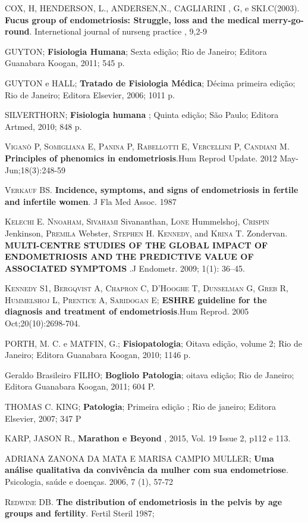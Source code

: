 \documentclass[12pt]{article} %
\begin{document}
COX, H, HENDERSON, L., ANDERSEN,N., CAGLIARINI , G, e SKI.C(2003).  \textbf{ Fucus group of endometriosis: Struggle, loss and the medical merry-go-round}. Internetional journal of nurseng practice , 9,2-9

GUYTON; \textbf{ Fisiologia Humana}; Sexta edição; Rio de Janeiro; Editora Guanabara
Koogan, 2011; 545 p.

GUYTON e HALL; \textbf{ Tratado de Fisiologia Médica}; Décima primeira edição; Rio de
Janeiro; Editora Elsevier, 2006; 1011 p.

SILVERTHORN;\textbf{ Fisiologia humana} ; Quinta edição; São Paulo; Editora Artmed, 2010; 848 p.

\textsc{Viganò} P, \textsc{Somigliana} E, \textsc{Panina} P,\textsc{ Rabellotti E, Vercellini P, Candiani} M. \textbf{Principles of phenomics in endometriosis}.Hum Reprod Update. 2012 May-Jun;18(3):248-59

\textsc{Verkauf} BS. \textbf{ Incidence, symptoms, and signs of endometriosis in fertile and infertile women}. J Fla Med Assoc. 1987

\textsc{Kelechi E. Nnoaham, Sivahami} Sivananthan, \textsc{Lone} Hummelshoj, \textsc{Crispin} Jenkinson, \textsc{Premila} Webster, \textsc{Stephen H. Kennedy}, and \textsc{Krina} T. Zondervan.\textbf{ MULTI-CENTRE STUDIES OF THE GLOBAL IMPACT OF ENDOMETRIOSIS AND THE PREDICTIVE VALUE OF ASSOCIATED SYMPTOMS }.J Endometr. 2009; 1(1): 36–45. 

\textsc{Kennedy S1, Bergqvist A, Chapron C, D'Hooghe T, Dunselman G, Greb R, Hummelshoj L, Prentice A, Saridogan E}; \textbf{ESHRE guideline for the diagnosis and treatment of endometriosis}.Hum Reprod. 2005 Oct;20(10):2698-704. 


PORTH, M. C. e MATFIN, G.;\textbf{ Fisiopatologia}; Oitava edição, volume 2; Rio de
Janeiro; Editora Guanabara Koogan, 2010; 1146 p.

Geraldo Brasileiro FILHO; \textbf{Bogliolo Patologia}; oitava edição; Rio de Janeiro; Editora Guanabara Koogan, 2011; 604 P.

THOMAS C. KING;\textbf{ Patologia}; Primeira edição ; Rio de janeiro; Editora Elsevier, 2007; 347 P

KARP, JASON R., \textbf{Marathon e Beyond }, 2015, Vol. 19 Issue 2, p112 e 113.

ADRIANA ZANONA DA MATA E MARISA CAMPIO MULLER;\textbf{ Uma análise qualitativa da convivência da mulher com sua endometriose}. Psicologia, saúde e doenças. 2006, 7 (1), 57-72

\textsc{Redwine DB}.\textbf{ The distribution of endometriosis in the pelvis by age groups and fertility}. Fertil Steril 1987; 
\end{document}
